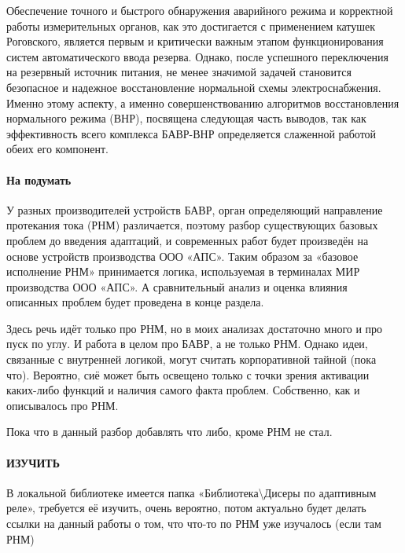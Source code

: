Обеспечение точного и быстрого обнаружения аварийного режима и корректной работы измерительных органов, как это достигается с применением катушек Роговского, является первым и критически важным этапом функционирования систем автоматического ввода резерва. Однако, после успешного переключения на резервный источник питания, не менее значимой задачей становится безопасное и надежное восстановление нормальной схемы электроснабжения. Именно этому аспекту, а именно совершенствованию алгоритмов восстановления нормального режима (ВНР), посвящена следующая часть выводов, так как эффективность всего комплекса БАВР-ВНР определяется слаженной работой обеих его компонент.




\paragraph{На подумать}

У разных производителей устройств БАВР, орган определяющий направление протекания тока (РНМ) различается, поэтому разбор существующих базовых проблем до введения адаптаций, и современных работ будет произведён на основе устройств производства ООО «АПС». Таким образом за «базовое исполнение РНМ» принимается логика, используемая в терминалах МИР производства ООО «АПС». А сравнительный анализ и оценка влияния описанных проблем будет проведена в конце раздела.

Здесь речь идёт только про РНМ, но в моих анализах достаточно много и про пуск по углу. И работа в целом про БАВР, а не только РНМ. Однако идеи, связанные с внутренней логикой, могут считать корпоративной тайной (пока что). Вероятно, сиё может быть освещено только с точки зрения активации каких-либо функций и наличия самого факта проблем. Собственно, как и описывалось про РНМ.

Пока что в данный разбор добавлять что либо, кроме РНМ не стал.


\paragraph{ИЗУЧИТЬ}

В локальной библиотеке имеется папка «Библиотека\textbackslash Дисеры по адаптивным реле», требуется её изучить, очень вероятно, потом актуально будет делать ссылки на данный работы о том, что что-то по РНМ уже изучалось (если там РНМ)

